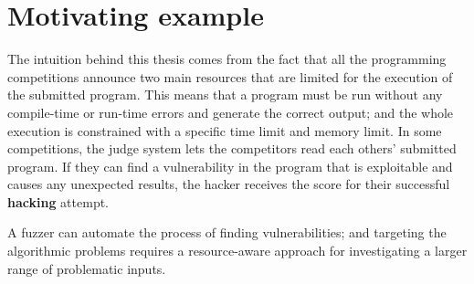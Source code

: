 \section{Motivating example}

The intuition behind this thesis comes from the fact that all the programming competitions announce two main resources that are limited for the execution of the submitted program. This means that a program must be run without any compile-time or run-time errors and generate the correct output; and the whole execution is constrained with a specific time limit and memory limit. \cite{manzoor2008common} In some competitions, the judge system lets the competitors read each others' submitted program. If they can find a vulnerability in the program that is exploitable and causes any unexpected results, the hacker receives the score for their successful \textbf{hacking} attempt. \cite{wasik2018survey}

A fuzzer can automate the process of finding vulnerabilities; and targeting the algorithmic problems requires a resource-aware approach for investigating a larger range of problematic inputs.